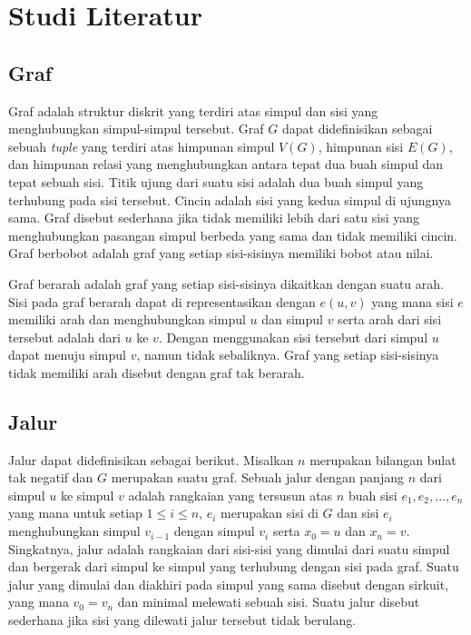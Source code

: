 \chapter{Studi Literatur}

\section{Graf}

Graf adalah struktur diskrit yang terdiri atas simpul dan sisi yang menghubungkan simpul-simpul tersebut. Graf $G$ dapat didefinisikan sebagai sebuah \textit{tuple} yang 
terdiri atas himpunan simpul $V(G)$, himpunan sisi $E(G)$, dan himpunan relasi yang menghubungkan antara tepat dua buah simpul dan tepat sebuah sisi. Titik ujung dari suatu sisi 
adalah dua buah simpul yang terhubung pada sisi tersebut. Cincin adalah sisi yang kedua simpul di ujungnya sama. Graf disebut sederhana jika tidak memiliki lebih 
dari satu sisi yang menghubungkan pasangan simpul berbeda yang sama dan tidak memiliki cincin. Graf berbobot adalah graf yang setiap sisi-sisinya memiliki bobot atau nilai.

Graf berarah adalah graf yang setiap sisi-sisinya dikaitkan dengan suatu arah. Sisi pada graf berarah 
dapat di representasikan dengan $e (u, v)$ yang mana sisi $e$ memiliki arah dan menghubungkan 
simpul $u$ dan simpul $v$ serta arah dari sisi tersebut adalah dari $u$ ke $v$. Dengan menggunakan 
sisi tersebut dari simpul $u$ dapat menuju simpul $v$, namun tidak sebaliknya. Graf yang setiap sisi-sisinya 
tidak memiliki arah disebut dengan graf tak berarah.


\section{Jalur}

Jalur dapat didefinisikan sebagai berikut. Misalkan $n$ merupakan bilangan bulat tak negatif dan $G$ merupakan suatu graf. Sebuah jalur dengan 
panjang $n$ dari simpul $u$ ke simpul $v$ adalah rangkaian yang tersusun atas $n$ buah sisi $e_{1}, e_{2}, ..., e_{n}$ yang mana untuk setiap $1 \leq i \leq n$, $e_{i}$ merupakan sisi 
di $G$ dan sisi $e_{i}$ menghubungkan simpul $v_{i-1}$ dengan simpul $v_{i}$ serta $x_{0} = u$ dan $x_{n} = v$. Singkatnya, jalur adalah rangkaian dari sisi-sisi yang dimulai dari 
suatu simpul dan bergerak dari simpul ke simpul yang terhubung dengan sisi pada graf. Suatu jalur yang dimulai dan diakhiri pada simpul yang sama disebut 
dengan sirkuit, yang mana $v_{0} = v_{n}$ dan minimal melewati sebuah sisi. Suatu jalur disebut sederhana jika sisi yang dilewati jalur tersebut tidak berulang.

